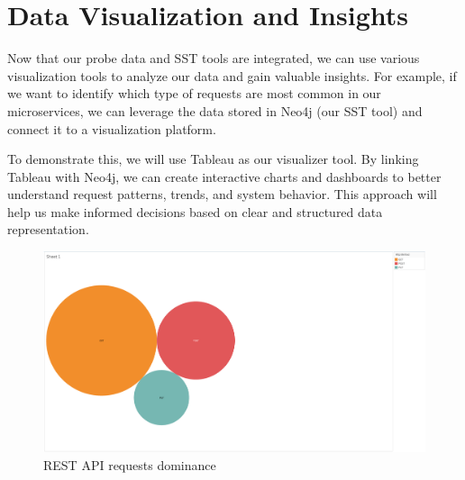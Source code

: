 \section{Data Visualization and Insights}\label{sec:data_visualization}

Now that our probe data and SST tools are integrated, we can use various visualization tools to analyze our data and gain valuable insights. For example, if we want to identify which type of requests are most common in our microservices, we can leverage the data stored in Neo4j (our SST tool) and connect it to a visualization platform.

To demonstrate this, we will use Tableau as our visualizer tool. By linking Tableau with Neo4j, we can create interactive charts and dashboards to better understand request patterns, trends, and system behavior. This approach will help us make informed decisions based on clear and structured data representation.

\begin{figure}[H]
    \centering
    \includegraphics[width=1\textwidth]{figures/tableau_1.png}
    \caption{REST API requests dominance}
    \label{fig:tableau}
\end{figure}